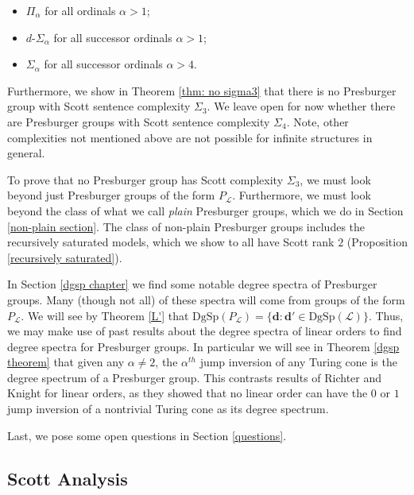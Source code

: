 \documentclass{amsart}%
\numberwithin{theorem}{section}
\newcommand{\0}{\emptyset}
\newcommand{\ddd}{\boldsymbol{d}}
\newcommand{\LL}{\mathcal{L}}
\newcommand{\dgsp}{\text{DgSp}}
\begin{document}
\begin{itemize}
    \item $\Pi_\alpha$ for all ordinals $\alpha>1$;
    \item $d$-$\Sigma_\alpha$ for all successor ordinals $\alpha>1$;
    \item $\Sigma_\alpha$ for all successor ordinals $\alpha>4$. 
    
\end{itemize}
Furthermore, we show in Theorem \ref{thm: no sigma3} that there is no Presburger group with Scott sentence complexity $\Sigma_3$. We leave open for now whether there are Presburger groups with Scott sentence complexity $\Sigma_4$. Note, other complexities not mentioned above are not possible for infinite structures in general.

To prove that no Presburger group has Scott complexity $\Sigma_3$, we must look beyond just Presburger groups of the form $P_\LL$. Furthermore, we must look beyond the class of what we call \emph{plain} Presburger groups, which we do in Section \ref{non-plain section}. The class of non-plain Presburger groups includes the recursively saturated models, which we show to all have Scott rank $2$ (Proposition \ref{recursively saturated}).

In Section \ref{dgsp chapter} we find some notable degree spectra of Presburger groups. Many (though not all) of these spectra will come from groups  of the form $P_\LL$. We will see by Theorem \ref{L'} that $\dgsp(P_\LL)=\{\ddd:\ddd'\in \dgsp(\LL)\}$. Thus, we may make use of past results about the degree spectra of linear orders to find degree spectra for Presburger groups. In particular we will see in Theorem \ref{dgsp theorem} that given any $\alpha\neq 2$, the $\alpha^{th}$ jump inversion of any Turing cone is the degree spectrum of a Presburger group. This contrasts results of Richter \cite{Richter_1981} and Knight \cite{Knight_1986} for linear orders, as they showed that no linear order can have  the $0$ or $1$ jump inversion of a nontrivial Turing cone as its degree spectrum.  

Last, we pose some open questions in Section \ref{questions}. 



\subsection{Scott Analysis}
\end{document}
